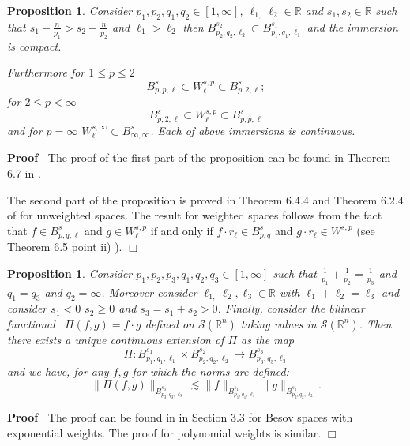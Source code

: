 \documentclass[a4paper,10pt]{article}
\newenvironment{proof}{\noindent\textbf{Proof\ }}{\hspace*{\fill}$\Box$\medskip}
\newtheorem{proposition}[theorem]{Proposition}
{\theorembodyfont{\rmfamily}\newtheorem{remark}[theorem]{Remark}}
\begin{document}
\begin{proposition}
  \label{proposition_inclusion}Consider $p_1, p_2, q_1, q_2 \in [1, \infty]$,
  $\ell_{1,} \ell_2 \in \mathbb{R}$ and $s_1, s_2 \in \mathbb{R}$ such that
  $s_1 - \frac{n}{p_1} > s_2 - \frac{n}{p_2}$ and $\ell_1 > \ell_2$ then
  $B^{s_2}_{p_2, q_2, \ell_2} \subset B^{s_1}_{p_1, q_1, \ell_1}$ and the
  immersion is compact.
  
  Furthermore for $1 \leq p \leq 2$
  \[ B^s_{p, p, \ell} \subset W^{s, p}_{\ell} \subset B^s_{p, 2, \ell} ; \]
  for $2 \leq p < \infty$
  \[ B^s_{p, 2, \ell} \subset W^{s, p}_{\ell} \subset B^s_{p, p, \ell} \]
  and for $p = \infty$ $W^{s, \infty}_{\ell} \subset B^s_{\infty, \infty}$.
  Each of above immersions is continuous. 
\end{proposition}

\begin{proof}
  The proof of the first part of the proposition can be found in Theorem 6.7
  in {\cite{Triebel2006}}.
  
  The second part of the proposition is proved in Theorem 6.4.4 and Theorem
  6.2.4 of {\cite{Joran1976}} for unweighted spaces. The result for weighted
  spaces follows from the fact that $f \in B^s_{p, q, \ell}$ and $g \in W^{s,
  p}_{\ell}$ if and only if $f \cdot r_{\ell} \in B^s_{p, q}$ and $g \cdot
  r_{\ell} \in W^{s, p}$ (see {\cite{Triebel2006}} Theorem 6.5 point ii) ). 
\end{proof}

\begin{proposition}
  \label{proposition_product}Consider $p_1, p_2, p_3, q_1, q_2, q_3 \in [1,
  \infty]$ such that $\frac{1}{p_1} + \frac{1}{p_2} = \frac{1}{p_3}$ and $q_1
  = q_3$ and $q_2 = \infty$. Moreover consider $\ell_{1,} \ell_2, \ell_3 \in
  \mathbb{R}$ with $\ell_1 + \ell_2 = \ell_3$ and consider $s_1 < 0$ $s_2 \geq
  0$ and $s_3 = s_1 + s_2 > 0$. Finally, consider the bilinear functional \
  $\Pi (f, g) = f \cdot g$ defined on $\mathcal{S} (\mathbb{R}^n)$ taking
  values in $\mathcal{S} (\mathbb{R}^n)$. Then there exists a unique
  continuous extension of $\Pi$ as the map
  \[ \Pi : B^{s_1}_{p_1, q_1, \ell_1} \times B^{s_2}_{p_2, q_2, \ell_2}
     \rightarrow B^{s_3}_{p_3, q_3, \ell_3} \]
  and we have, for any $f, g$ for which the norms are defined:
  \[ \| \Pi (f, g) \|_{B^{s_3}_{p_3, q_3, \ell_3}} \lesssim \| f
     \|_{B^{s_1}_{p_1, q_1, \ell_1}} \| g \|_{B^{s_2}_{p_2, q_2, \ell_2}} . \]
\end{proposition}

\begin{proof}
  The proof can be found in {\cite{MW17}} in Section 3.3 for Besov spaces with
  exponential weights. The proof for polynomial weights is similar.
\end{proof}
\end{document}
